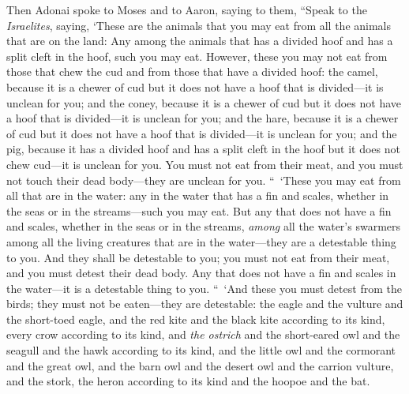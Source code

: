 \begin{biblechapter} %
 Then Adonai spoke to Moses and to Aaron, saying to them,
\verse “Speak to the \textit{Israelites}, saying, ‘These are the animals that you may eat from all the animals that are on the land:
\verse Any among the animals that has a divided hoof and has a split cleft in the hoof, such you may eat.
\verse However, these you may not eat from those that chew the cud and from those that have a divided hoof: the camel, because it is a chewer of cud but it does not have a hoof that is divided—it is unclean for you;
\verse and the coney, because it is a chewer of cud but it does not have a hoof that is divided—it is unclean for you;
\verse and the hare, because it is a chewer of cud but it does not have a hoof that is divided—it is unclean for you;
\verse and the pig, because it has a divided hoof and has a split cleft in the hoof but it does not chew cud—it is unclean for you.
\verse You must not eat from their meat, and you must not touch their dead body—they are unclean for you.
\verse “ ‘These you may eat from all that are in the water: any in the water that has a fin and scales, whether in the seas or in the streams—such you may eat.
\verse But any that does not have a fin and scales, whether in the seas or in the streams, \textit{among} all the water’s swarmers among all the living creatures that are in the water—they are a detestable thing to you.
\verse And they shall be detestable to you; you must not eat from their meat, and you must detest their dead body.
\verse Any that does not have a fin and scales in the water—it is a detestable thing to you.
\verse “ ‘And these you must detest from the birds; they must not be eaten—they are detestable: the eagle and the vulture and the short-toed eagle,
\verse and the red kite and the black kite according to its kind,
\verse every crow according to its kind,
\verse and \textit{the ostrich} and the short-eared owl and the seagull and the hawk according to its kind,
\verse and the little owl and the cormorant and the great owl,
\verse and the barn owl and the desert owl and the carrion vulture,
\verse and the stork, the heron according to its kind and the hoopoe and the bat.

\end{biblechapter}
